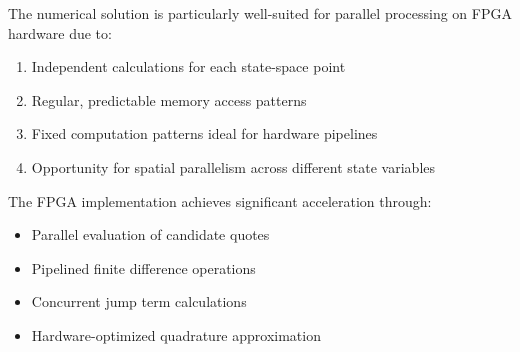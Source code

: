 \documentclass[onecolumn,ieee]{arithmaxresearch}
\begin{document}
The numerical solution is particularly well-suited for parallel processing on FPGA hardware due to:

\begin{enumerate}
    \item Independent calculations for each state-space point
    \item Regular, predictable memory access patterns 
    \item Fixed computation patterns ideal for hardware pipelines
    \item Opportunity for spatial parallelism across different state variables
\end{enumerate}

The FPGA implementation achieves significant acceleration through:
\begin{itemize}
    \item Parallel evaluation of candidate quotes
    \item Pipelined finite difference operations
    \item Concurrent jump term calculations
    \item Hardware-optimized quadrature approximation
\end{itemize}
\end{document}
